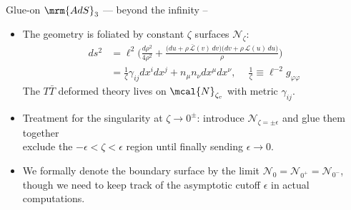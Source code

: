 \documentclass[aspectratio=169,10pt
	,noamsthm
]{beamer}
\newcommand{\TTbar}{\texorpdfstring{\ensuremath{T\bar{T}}}{TTbar}\xspace}
\begin{document}
\begin{frame}{Glue-on $\mrm{AdS}_3$ --- beyond the infinity}{%
	\textcite{Apolo:2023vnm} -- 
}
\begin{itemize}
\item The geometry is foliated by constant $\zeta$ surfaces ${\mathcal N}_\zeta$:
	\begin{equation}
	\begin{aligned}
		ds^2 
		&= \ell^2 \bigg( \frac{d\rho^2}{4 \rho^2} + \frac{ \big( du + \rho \, \mathcal {\bar L}(v)\, dv \big) \big( dv + \rho \, \mathcal L(u)\, du \big) }{\rho} \bigg) \\
		&= \frac{1}{\zeta} \gamma_{ij}dx^i dx^j+n_\mu n_\nu dx^\mu dx^\nu,\ \quad
	\frac{1}{\zeta} \equiv \ell^{-2} g_{\varphi\varphi}
	\end{aligned}
	\end{equation}
	The \TTbar deformed theory lives on $\mcal{N}_{\zeta_c}$ with metric $\gamma_{ij}$.
	
\pause
\item Treatment for the singularity at $\zeta\to 0^\pm$: introduce $\mathcal N_{\zeta={\pm\epsilon}}$ and glue them together\\
	exclude the $-\epsilon < \zeta < \epsilon$ region until finally sending $\epsilon \to 0$. 
\item We formally denote the boundary surface by the limit $\mathcal N_{0}=\mathcal N_{0^+}=\mathcal N_{0^-}$, though we need to keep track of the asymptotic cutoff $\epsilon$ in actual computations.
\end{itemize}
\end{frame}

\newcommand{\stateGlueon}{\ensuremath{
	\textrm{Cutoff / \textit{glue-on} $\mrm{AdS}_{d+1}$ Gravity}
	\ \equiv\ %
	\textrm{\TTbar deformed $\mrm{CFT}_{d}$ at $\mcal{N}_{\zeta_c}$}\qquad
}}
\end{document}
